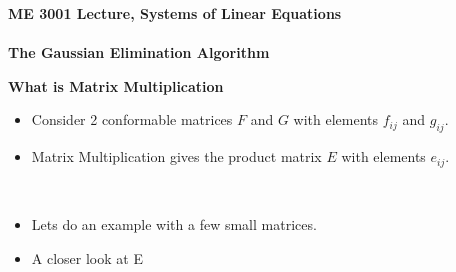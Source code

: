 \documentclass[11pt]{article}
\begin{document}
\textbf{ \LARGE ME 3001 Lecture, Systems of Linear Equations} \\\\
\textbf{ \LARGE The Gaussian Elimination Algorithm} \\


 \renewcommand\labelitemi{\textbullet}
 \renewcommand\labelitemii{\textendash}
 \renewcommand\labelitemiii{\textasteriskcentered}
 \renewcommand\labelitemiv{\textperiodcentered}
\begin{description}

\item \textbf{\LARGE What is Matrix Multiplication}	
\begin{itemize}
		\item Consider 2 conformable matrices $F$ and $G$ with elements $f_{ij}$ and $g_{ij}$. 
		 \item Matrix Multiplication gives the product matrix $E$ with elements $e_{ij}$.  \\ \vspace{5mm}
		 
		 	  \\ \vspace{20mm}
		 
		 \item Lets do an example with a few small matrices. \\
		 

		 
		 \vspace{20mm}
		 
		 \item A closer look at E \\ \vspace{10mm}
		 

\end{itemize}
\end{description}
\end{document}
